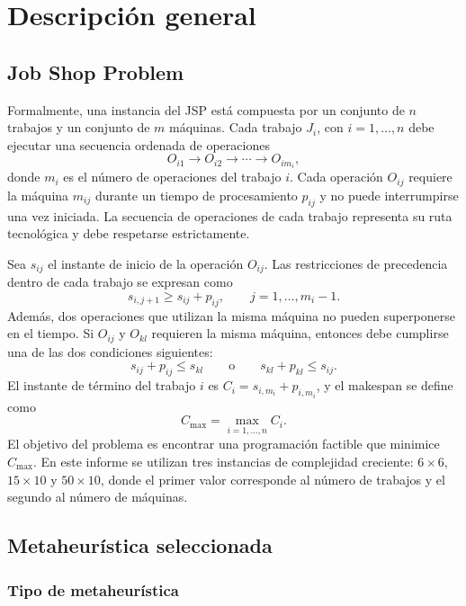 \chapter{Descripción general}
\label{ch:descripcion}

\section{Job Shop Problem}

Formalmente, una instancia del JSP está compuesta por un conjunto de \(n\) trabajos
y un conjunto de \(m\) máquinas. Cada trabajo \(J_i\), con \(i=1,\ldots,n\)
debe ejecutar una secuencia ordenada de operaciones
\[
    O_{i1} \rightarrow O_{i2} \rightarrow \cdots \rightarrow O_{im_i},
\]
donde \(m_i\) es el número de operaciones del trabajo \(i\).
Cada operación \(O_{ij}\) requiere la máquina \(m_{ij}\)
durante un tiempo de procesamiento \(p_{ij}\) y no puede interrumpirse una vez iniciada.
La secuencia de operaciones de cada trabajo representa su ruta tecnológica y debe respetarse estrictamente.

Sea \(s_{ij}\) el instante de inicio de la operación \(O_{ij}\).
Las restricciones de precedencia dentro de cada trabajo se expresan como
\[
    s_{i,j+1} \ge s_{ij} + p_{ij}, \qquad j=1,\ldots,m_i-1.
\]
Además, dos operaciones que utilizan la misma máquina no pueden superponerse en el tiempo.
Si \(O_{ij}\) y \(O_{kl}\) requieren la misma máquina, entonces debe cumplirse una de las dos condiciones siguientes:
\[
    s_{ij} + p_{ij} \le s_{kl}
    \qquad \text{o} \qquad
    s_{kl} + p_{kl} \le s_{ij}.
\]
El instante de término del trabajo \(i\) es \(C_i = s_{i,m_i} + p_{i,m_i}\), y el makespan se define como
\[
    C_{\max} = \max_{i=1,\ldots,n} C_i.
\]
El objetivo del problema es encontrar una programación factible que minimice \(C_{\max}\).
En este informe se utilizan tres instancias de complejidad creciente:
\(6\times6\), \(15\times10\) y \(50\times10\),
donde el primer valor corresponde al número de trabajos y el segundo al número de máquinas.

\section{Metaheurística seleccionada}

\subsection{Tipo de metaheurística}

